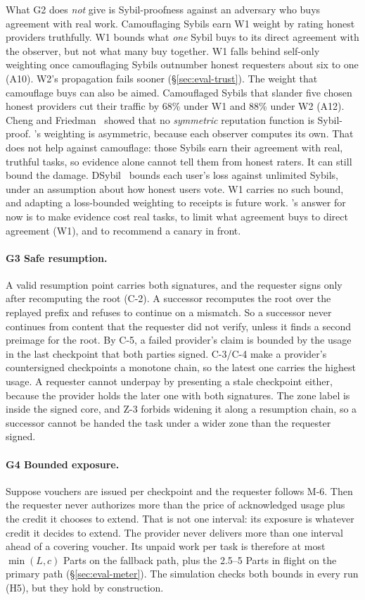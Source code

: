 What G2 does \emph{not} give is Sybil-proofness against an adversary who
buys agreement with real work. Camouflaging Sybils earn W1 weight by
rating honest providers truthfully. W1 bounds what \emph{one} Sybil buys
to its direct agreement with the observer, but not what many buy
together. W1 falls behind self-only weighting once camouflaging Sybils
outnumber honest requesters about six to one (A10). W2's propagation
fails sooner (\S\ref{sec:eval-trust}). The weight that camouflage buys can
also be aimed. Camouflaged Sybils that slander five chosen honest
providers cut their traffic by 68\% under W1 and 88\% under W2 (A12). Cheng and Friedman~\cite{cheng2005sybilproof}
showed that no
\emph{symmetric} reputation function is Sybil-proof. \sys{}'s weighting
is asymmetric, because each observer computes its own. That does not
help against camouflage: those Sybils earn their agreement with real,
truthful tasks, so evidence alone cannot tell them from honest raters. It
can still bound the damage. DSybil~\cite{yu2009dsybil} bounds each user's
loss against unlimited Sybils, under an assumption about how honest users
vote. W1 carries no such bound, and adapting a loss-bounded weighting to
receipts is future work. \sys{}'s answer for now is to make evidence cost
real tasks, to limit what agreement buys to direct agreement (W1), and to
recommend a canary in front.

\paragraph{G3 Safe resumption.}
A valid resumption point carries both signatures, and the requester
signs only after recomputing the root (C-2). A successor recomputes the
root over the replayed prefix and refuses to continue on a mismatch. So a
successor never continues from content that the requester did not verify,
unless it finds a second preimage for the root. By C-5, a failed
provider's claim is bounded by the usage in the last checkpoint that
both parties signed. C-3/C-4 make a provider's countersigned checkpoints
a monotone chain, so the latest one carries the highest usage. A
requester cannot underpay by presenting a stale checkpoint either,
because the provider holds the later one with both signatures. The zone
label is inside the signed core, and Z-3 forbids widening it along a
resumption chain, so a successor cannot be handed the task under a wider
zone than the requester signed.

\paragraph{G4 Bounded exposure.}
Suppose vouchers are issued per checkpoint and the requester follows M-6.
Then the requester never authorizes more than the price of acknowledged
usage plus the credit it chooses to extend. That is not one interval: its
exposure is whatever credit it decides to extend. The provider never
delivers more than one interval ahead of a covering voucher. Its unpaid
work per task is therefore at most $\min(L,c)$ Parts on the fallback
path, plus the 2.5--5 Parts in flight on the primary path
(\S\ref{sec:eval-meter}). The simulation checks both bounds in every run
(H5), but they hold by construction.

